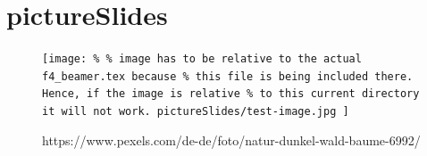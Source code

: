 \section{pictureSlides}

\begin{frame}
    \begin{figure}[htp]
        \centering
        \texttt{[image: \%
            \% image has to be relative to the actual f4\_beamer.tex because
            \% this file is being included there. Hence, if the image is relative
            \% to this current directory it will not work.
            pictureSlides/test-image.jpg
        ]}
        \caption{%
            https://www.pexels.com/de-de/foto/natur-dunkel-wald-baume-6992/
        }
    \end{figure}
\end{frame}

